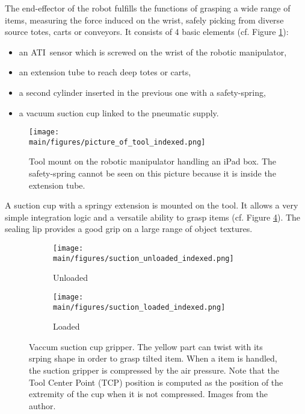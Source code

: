 \documentclass[/home/francois/latex/report/main.tex]{subfiles}
\begin{document}
The end-effector of the robot fulfills the functions of grasping a wide range of items, measuring the force induced on the wrist, safely picking from diverse source totes, carts or conveyors. It consists of 4 basic elements (cf. Figure \ref{fig:background:tool}):

\begin{itemize}
  \item an ATI\texttrademark \ sensor which is screwed on the wrist of the robotic manipulator,
  \item an extension tube to reach deep totes or carts,
  \item a second cylinder inserted in the previous one with a safety-spring,
  \item a vacuum suction cup linked to the pneumatic supply.
\end{itemize}

\begin{figure}[h]
  \centering
  \texttt{[image: \\main/figures/picture\_of\_tool\_indexed.png]}
  \caption{Tool mount on the robotic manipulator handling an iPad box. The safety-spring cannot be seen on this picture because it is inside the extension tube.}
  \label{fig:background:tool}
\end{figure}

A suction cup with a springy extension is mounted on the tool. It allows a very simple integration logic and a versatile ability to grasp items (cf. Figure \ref{fig:background:suction}). The sealing lip provides a good grip on a large range of object textures.

\begin{figure}[h]
\centering
\begin{subfigure}{0.49\textwidth}
\centering
\texttt{[image: \\main/figures/suction\_unloaded\_indexed.png]}
\caption{Unloaded}
\label{fig:background:suction-unloaded}
\end{subfigure}
\begin{subfigure}{0.49\textwidth}
\centering
\texttt{[image: \\main/figures/suction\_loaded\_indexed.png]}
\caption{Loaded}
\label{fig:background:suction-loaded}
\end{subfigure}
\caption{Vaccum suction cup gripper. The yellow part can twist with its srping shape in order to grasp tilted item. When a item is handled, the suction gripper is compressed by the air pressure. Note that the Tool Center Point (TCP) position is computed as the position of the extremity of the cup when it is not compressed. Images from the author.}
\label{fig:background:suction}
\end{figure}
\end{document}
